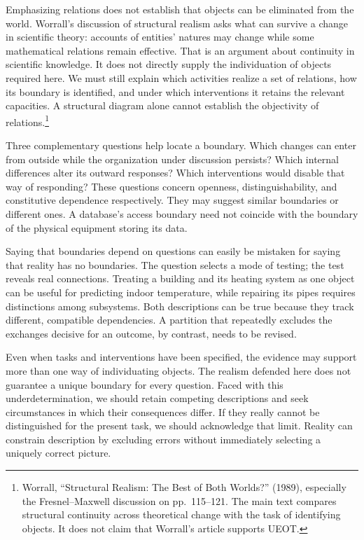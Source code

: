\documentclass[
  english,
  11pt,
  oneside]{book}
\begin{document}
Emphasizing relations does not establish that objects can be eliminated from the world. Worrall's discussion of structural realism asks what can survive a change in scientific theory: accounts of entities' natures may change while some mathematical relations remain effective. That is an argument about continuity in scientific knowledge. It does not directly supply the individuation of objects required here. We must still explain which activities realize a set of relations, how its boundary is identified, and under which interventions it retains the relevant capacities. A structural diagram alone cannot establish the objectivity of relations.\footnote{\hypertarget{ph-note-8}{}Worrall, ``Structural Realism: The Best of Both Worlds?'' (1989), especially the Fresnel--Maxwell discussion on pp.~115--121. The main text compares structural continuity across theoretical change with the task of identifying objects. It does not claim that Worrall's article supports UEOT.}

Three complementary questions help locate a boundary. Which changes can enter from outside while the organization under discussion persists? Which internal differences alter its outward responses? Which interventions would disable that way of responding? These questions concern openness, distinguishability, and constitutive dependence respectively. They may suggest similar boundaries or different ones. A database's access boundary need not coincide with the boundary of the physical equipment storing its data.

Saying that boundaries depend on questions can easily be mistaken for saying that reality has no boundaries. The question selects a mode of testing; the test reveals real connections. Treating a building and its heating system as one object can be useful for predicting indoor temperature, while repairing its pipes requires distinctions among subsystems. Both descriptions can be true because they track different, compatible dependencies. A partition that repeatedly excludes the exchanges decisive for an outcome, by contrast, needs to be revised.

Even when tasks and interventions have been specified, the evidence may support more than one way of individuating objects. The realism defended here does not guarantee a unique boundary for every question. Faced with this underdetermination, we should retain competing descriptions and seek circumstances in which their consequences differ. If they really cannot be distinguished for the present task, we should acknowledge that limit. Reality can constrain description by excluding errors without immediately selecting a uniquely correct picture.
\end{document}
